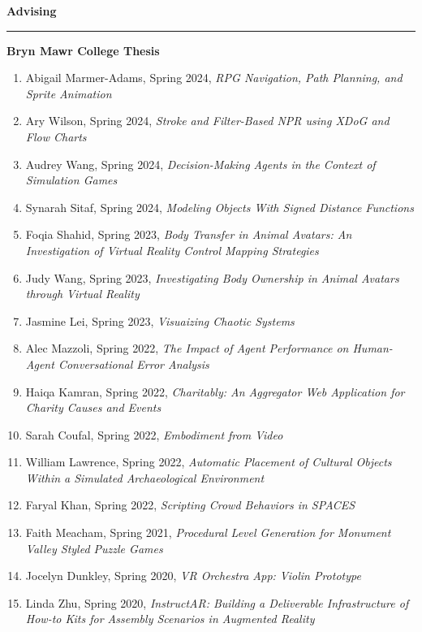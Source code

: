 \needspace{6em}
{\large {\bf Advising}}
\vspace{0.1cm}
\hrule
\medskip
\medskip

{\bf Bryn Mawr College Thesis }
\vspace{-1.0em}

\begin{enumerate}[leftmargin=*,label={}]
  \item Abigail Marmer-Adams, Spring 2024, \textit{RPG Navigation, Path Planning, and Sprite Animation}
  \item Ary Wilson, Spring 2024, \textit{Stroke and Filter-Based NPR using XDoG and Flow Charts}
  \item Audrey Wang, Spring 2024, \textit{Decision-Making Agents in the Context of Simulation Games}
  \item Synarah Sitaf, Spring 2024, \textit{Modeling Objects With Signed Distance Functions}
  \item Foqia Shahid, Spring 2023, \textit{Body Transfer in Animal Avatars: An Investigation of Virtual Reality Control Mapping Strategies}
  \item Judy Wang, Spring 2023, \textit{Investigating Body Ownership in Animal Avatars through Virtual Reality}
  \item Jasmine Lei, Spring 2023, \textit{Visuaizing Chaotic Systems}
  \item Alec Mazzoli, Spring 2022, \textit{The Impact of Agent Performance on Human-Agent Conversational Error Analysis}
  \item Haiqa Kamran, Spring 2022, \textit{Charitably: An Aggregator Web Application for Charity Causes and Events}
  \item Sarah Coufal, Spring 2022, \textit{Embodiment from Video}
  \item William Lawrence, Spring 2022, \textit{Automatic Placement of Cultural Objects Within a Simulated Archaeological Environment}
  \item Faryal Khan, Spring 2022, \textit{Scripting Crowd Behaviors in SPACES}
  \item Faith Meacham, Spring 2021, \textit{Procedural Level Generation for \textit{Monument Valley} Styled Puzzle Games}
  \item Jocelyn Dunkley, Spring 2020, \textit{VR Orchestra App: Violin Prototype}
  \item Linda Zhu, Spring 2020, \textit{InstructAR: Building a Deliverable Infrastructure of How-to Kits for Assembly Scenarios in Augmented Reality}
\end{enumerate}

